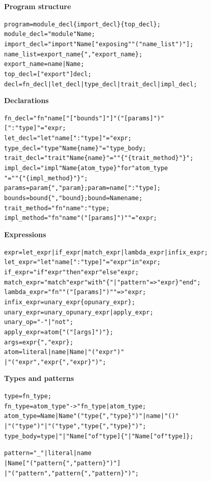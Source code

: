 \documentclass[10pt,a4paper]{article}
\theoremstyle{plain}
\theoremstyle{definition}
\theoremstyle{remark}
\begin{document}
\medskip\noindent\textbf{Program structure}
{\small\begin{alltt}
program     = module_decl \{ import_decl \} \{ top_decl \} ;
module_decl = "module" Name ;
import_decl = "import" Name [ "exposing" "(" name_list ")" ] ;
name_list   = export_name \{ "," export_name \} ;
export_name = name | Name ;
top_decl    = [ "export" ] decl ;
decl        = fn_decl | let_decl | type_decl | trait_decl | impl_decl ;
\end{alltt}}

\medskip\noindent\textbf{Declarations}
{\small\begin{alltt}
fn_decl      = "fn" name [ "[" bounds "]" ] "(" [ params ] ")"
               [ ":" type ] "=" expr ;
let_decl     = "let" name [ ":" type ] "=" expr ;
type_decl    = "type" Name \{ name \} "=" type_body ;
trait_decl   = "trait" Name \{ name \} "=" "\{" \{ trait_method \} "\}" ;
impl_decl    = "impl" Name \{ atom_type \} "for" atom_type
               "=" "\{" \{ impl_method \} "\}" ;
params       = param \{ "," param \} ;  param = name [ ":" type ] ;
bounds       = bound \{ "," bound \} ;  bound = Name name ;
trait_method = "fn" name ":" type ;
impl_method  = "fn" name "(" [ params ] ")" "=" expr ;
\end{alltt}}

\medskip\noindent\textbf{Expressions}
{\small\begin{alltt}
expr        = let_expr | if_expr | match_expr | lambda_expr | infix_expr ;
let_expr    = "let" name [ ":" type ] "=" expr "in" expr ;
if_expr     = "if" expr "then" expr "else" expr ;
match_expr  = "match" expr "with" \{ "|" pattern "=>" expr \} "end" ;
lambda_expr = "fn" "(" [ params ] ")" "=>" expr ;
infix_expr  = unary_expr \{ op unary_expr \} ;
unary_expr  = unary_op unary_expr | apply_expr ;
unary_op    = "-" | "not" ;
apply_expr  = atom \{ "(" [ args ] ")" \} ;
args        = expr \{ "," expr \} ;
atom        = literal | name | Name | "(" expr ")"
            | "(" expr "," expr \{ "," expr \} ")" ;
\end{alltt}}

\medskip\noindent\textbf{Types and patterns}
{\small\begin{alltt}
type      = fn_type ;
fn_type   = atom_type "->" fn_type | atom_type ;
atom_type = Name | Name "(" type \{ "," type \} ")" | name | "()"
          | "(" type ")" | "(" type "," type \{ "," type \} ")" ;
type_body = type | "|" Name [ "of" type ] \{ "|" Name [ "of" type ] \} ;

pattern   = "_" | literal | name
          | Name [ "(" pattern \{ "," pattern \} ")" ]
          | "(" pattern "," pattern \{ "," pattern \} ")" ;
\end{alltt}}
\end{document}

